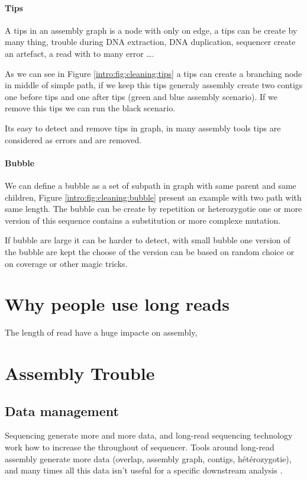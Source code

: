 \documentclass[./main.tex]{subfiles}
\begin{document}
\paragraph{Tips}

A tips in an assembly graph is a node with only on edge, a tips can be create by many thing, trouble during DNA extraction, DNA duplication, sequencer create an artefact, a read with to many error ….

As we can see in Figure \ref{intro:fig:cleaning:tips} a tips can create a branching node in middle of simple path, if we keep this tips generaly assembly create two contigs one before tips and one after tips (green and blue assembly scenario). If we remove this tips we can run the black scenario.

Its easy to detect and remove tips in graph, in many assembly tools tips are considered as errors and are removed.

\paragraph{Bubble}

We can define a bubble as a set of subpath in graph with same parent and same children, Figure \ref{intro:fig:cleaning:bubble} present an example with two path with same length. The bubble can be create by repetition or heterozygotie one or more version of this sequence contains a substitution or more complexe mutation.

If bubble are large it can be harder to detect, with small bubble one version of the bubble are kept the choose of the version can be based on random choice or on coverage or other magic tricks.

\section{Why people use long reads}

The length of read have a huge impacte on assembly, 

\section{Assembly Trouble}

\subsection{Data management}

Sequencing generate more and more data, and long-read sequencing technology work how to increase the throughout of sequencer. Tools around long-read assembly generate more data (overlap, assembly graph, contigs, hétérozygotie), and many times all this data isn't useful for a specific downstream analysis .
\end{document}

